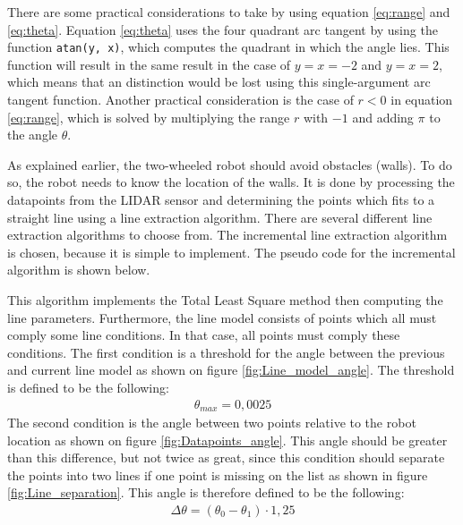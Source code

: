 \documentclass[../Head/Main.tex]{subfiles}
\begin{document}
There are some practical considerations to take by using equation \ref{eq:range} and \ref{eq:theta}. Equation \ref{eq:theta} uses the four quadrant arc tangent by using the function \texttt{atan(y, x)}, which computes the quadrant in which the angle lies. This function will result in the same result in the case of $y  = x = -2$ and $y = x = 2$, which means that an distinction would be lost using this single-argument arc tangent function. Another practical consideration is the case of $r < 0$ in equation \ref{eq:range}, which is solved by multiplying the range $r$ with $-1$ and adding $\pi$ to the angle $\theta$. \par
As explained earlier, the two-wheeled robot should avoid obstacles (walls). To do so, the robot needs to know the location of the walls. It is done by processing the datapoints from the LIDAR sensor and determining the points which fits to a straight line using a line extraction algorithm. There are several different line extraction algorithms to choose from. The incremental line extraction algorithm is chosen, because it is simple to implement. The pseudo code for the incremental algorithm is shown below. \par

This algorithm implements the Total Least Square method then computing the line parameters. Furthermore, the line model consists of points which all must comply some line conditions. In that case, all points must comply these conditions. The first condition is a threshold for the angle between the previous and current line model as shown on figure \ref{fig:Line_model_angle}. The threshold is defined to be the following:
\begin{align*}
	\theta_{max} = 0,0025
\end{align*}
The second condition is the angle between two points relative to the robot location as shown on figure \ref{fig:Datapoints_angle}. This angle should be greater than this difference, but not twice as great, since this condition should separate the points into two lines if one point is missing on the list as shown in figure \ref{fig:Line_separation}. This angle is therefore defined to be the following:
\begin{align*}
	\Delta\theta = \left(\theta_0 - \theta_1\right)\cdot 1,25
\end{align*}

\end{document}
